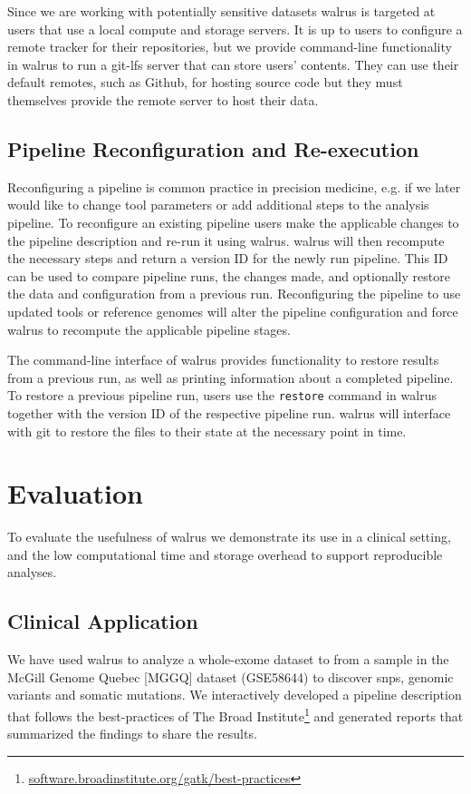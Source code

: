 Since we are working with potentially sensitive datasets walrus is targeted at
users that use a local compute and storage servers. It is up to users to
configure a remote tracker for their repositories, but we provide command-line
functionality in walrus to run a git-lfs server that can store users' contents.
They can use their default remotes, such as Github, for hosting source code but
they must themselves provide the remote server to host their data.

\subsection{Pipeline Reconfiguration and Re-execution}
Reconfiguring a pipeline is common practice in precision medicine, e.g. if we
later would like to change tool parameters or add additional steps to the
analysis pipeline. To reconfigure an existing pipeline users make the applicable
changes to the pipeline description and re-run it using walrus. walrus will then
recompute the necessary steps and return a version ID for the newly run
pipeline. This ID can be used to compare pipeline runs, the changes made, and
optionally restore the data and configuration from a previous run. 
Reconfiguring the pipeline to use updated tools or reference genomes will alter
the pipeline configuration and force walrus to recompute the applicable pipeline
stages. 

The command-line interface of walrus provides functionality to restore results
from a previous run, as well as printing information about a completed pipeline.
To restore a previous pipeline run, users use the \texttt{restore} command in
walrus together with the version ID of the respective pipeline run. walrus will
interface with git to restore the files to their state at the necessary point in
time.

\section{Evaluation}
To evaluate the usefulness of walrus we demonstrate its use in a clinical
setting, and the low computational time and storage overhead to support
reproducible analyses.

\subsection{Clinical Application} 
We have used walrus to analyze a whole-exome dataset to from a sample in the
McGill Genome Quebec [MGGQ] dataset (GSE58644)\cite{tofigh2014prognostic} to
discover \glspl{snp}, genomic variants and somatic mutations. We interactively
developed a pipeline description that follows the best-practices of The Broad
Institute\footnote{\url{software.broadinstitute.org/gatk/best-practices}} and
generated reports that summarized the findings to share the results. 

